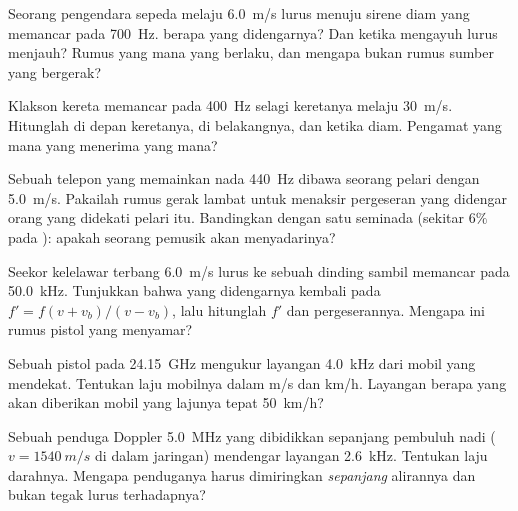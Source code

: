 \begin{exercise}[$\star$]\label{exo:g12:doppler-effect:3}
Seorang pengendara sepeda melaju \qty{6.0}{m/s} lurus menuju sirene diam yang memancar pada
\qty{700}{Hz}.  berapa yang didengarnya? Dan ketika mengayuh lurus menjauh? Rumus
yang mana yang berlaku, dan mengapa bukan rumus sumber yang bergerak?
\end{exercise}

\begin{exercise}[$\star$]\label{exo:g12:doppler-effect:4}
Klakson kereta memancar pada \qty{400}{Hz} selagi keretanya melaju \qty{30}{m/s}.
Hitunglah  di depan keretanya, di belakangnya, dan ketika diam.
Pengamat yang mana yang menerima yang mana?
\end{exercise}

\begin{exercise}[$\star$]\label{exo:g12:doppler-effect:5}
Sebuah telepon yang memainkan nada \qty{440}{Hz} dibawa seorang pelari dengan
\qty{5.0}{m/s}. Pakailah rumus gerak lambat untuk menaksir pergeseran yang didengar orang
yang didekati pelari itu. Bandingkan dengan satu seminada (sekitar $6\%$ pada
): apakah seorang pemusik akan menyadarinya?
\end{exercise}

\begin{exercise}[$\star\star$]\label{exo:g12:doppler-effect:6}
Seekor kelelawar terbang \qty{6.0}{m/s} lurus ke sebuah dinding sambil memancar pada
\qty{50.0}{kHz}. Tunjukkan bahwa  yang didengarnya kembali pada
$f' = f(v + v_b)/(v - v_b)$, lalu hitunglah $f'$ dan pergeserannya. Mengapa ini rumus
pistol  yang menyamar?
\end{exercise}

\begin{exercise}[$\star\star$]\label{exo:g12:doppler-effect:7}
Sebuah pistol  pada \qty{24.15}{GHz} mengukur layangan \qty{4.0}{kHz} dari mobil yang
mendekat. Tentukan laju mobilnya dalam \unit{m/s} dan \unit{km/h}. Layangan berapa yang
akan diberikan mobil yang lajunya tepat \qty{50}{km/h}?
\end{exercise}

\begin{exercise}[$\star\star$]\label{exo:g12:doppler-effect:8}
Sebuah penduga  Doppler \qty{5.0}{MHz} yang dibidikkan sepanjang pembuluh nadi
($v = \qty{1540}{m/s}$ di dalam jaringan) mendengar layangan \qty{2.6}{kHz}. Tentukan laju
darahnya. Mengapa penduganya harus dimiringkan \emph{sepanjang} alirannya dan bukan tegak
lurus terhadapnya?
\end{exercise}

